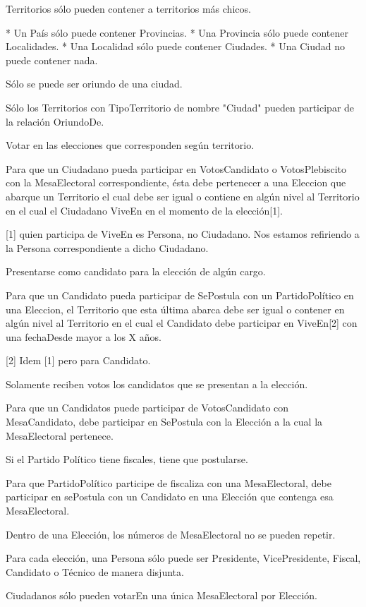 Territorios sólo pueden contener a territorios más chicos.

* Un País sólo puede contener Provincias.
* Una Provincia sólo puede contener Localidades.
* Una Localidad sólo puede contener Ciudades.
* Una Ciudad no puede contener nada.

Sólo se puede ser oriundo de una ciudad.

Sólo los Territorios con TipoTerritorio de nombre "Ciudad" pueden participar de la relación OriundoDe.

Votar en las elecciones que corresponden según territorio.

Para que un Ciudadano pueda participar en VotosCandidato o VotosPlebiscito con la MesaElectoral correspondiente, ésta debe pertenecer a una Eleccion que abarque un Territorio el cual debe ser igual o contiene en algún nivel al Territorio en el cual el Ciudadano ViveEn en el momento de la elección[1].

[1] quien participa de ViveEn es Persona, no Ciudadano. Nos estamos refiriendo a la Persona correspondiente a dicho Ciudadano.

Presentarse como candidato para la elección de algún cargo.

Para que un Candidato pueda participar de SePostula con un PartidoPolítico en una Eleccion, el Territorio que esta última abarca debe ser igual o contener en algún nivel al Territorio en el cual el Candidato debe participar en ViveEn[2] con una fechaDesde mayor a los X años.

[2] Idem [1] pero para Candidato.

Solamente reciben votos los candidatos que se presentan a la elección.

Para que un Candidatos puede participar de VotosCandidato con MesaCandidato, debe participar en SePostula con la Elección a la cual la MesaElectoral pertenece.

Si el Partido Político tiene fiscales, tiene que postularse.

Para que PartidoPolítico participe de fiscaliza con una MesaElectoral, debe participar en sePostula con un Candidato en una Elección que contenga esa MesaElectoral.

Dentro de una Elección, los números de MesaElectoral no se pueden repetir.

Para cada elección, una Persona sólo puede ser Presidente, VicePresidente, Fiscal, Candidato o Técnico de manera disjunta.

Ciudadanos sólo pueden votarEn una única MesaElectoral por Elección.


